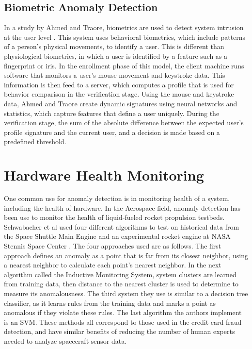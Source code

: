 \documentclass[midd]{thesis}
\begin{document}
\subsection{Biometric Anomaly Detection}

In a study by Ahmed and Traore, biometrics are used to detect system intrusion at the user level \cite{Ahmed2005}. This system uses behavioral biometrics, which include patterns of a person's physical movements, to identify a user. This is different than physiological biometrics, in which a user is identified by a feature such as a fingerprint or iris. In the enrollment phase of this model, the client machine runs software that monitors a user's mouse movement and keystroke data. This information is then feed to a server, which computes a profile that is used for behavior comparison in the verification stage. Using the mouse and keystroke data, Ahmed and Traore create dynamic signatures using neural networks and statistics, which capture features that define a user uniquely. During the verification stage, the sum of the absolute difference between the expected user's profile signature and the current user, and a decision is made based on a predefined threshold.

\section{Hardware Health Monitoring}

One common use for anomaly detection is in monitoring health of a system, including the health of hardware. In the Aerospace field, anomaly detection has been use to monitor the health of liquid-fueled rocket propulsion testbeds. Schwabacher et al used four different algorithms to test on historical data from the Space Shuttle Main Engine and an experimental rocket engine at NASA Stennis Space Center \cite{Schwabacher2009}. The four approaches used are as follows. The first approach defines an anomaly as a point that is far from its closest neighbor, using a nearest neighbor to calculate each point's nearest neighbor. In the next algorithm called the Inductive Monitoring System, system clusters are learned from training data, then distance to the nearest cluster is used to determine to measure its anomalousness. The third system they use is similar to a decision tree classifier, as it learns rules from the training data and marks a point as anomalous if they violate these rules. The last algorithm the authors implement is an SVM. These methods all correspond to those used in the credit card fraud detection, and have similar benefits of reducing the number of human experts needed to analyze spacecraft sensor data. 
\end{document}
